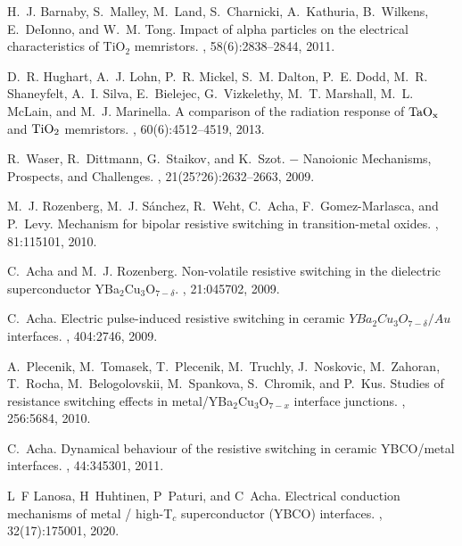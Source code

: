 \documentclass[square,aip,preprint,showkeys,superscriptaddress]{revtex4}
\begin{document}
\begin{thebibliography}{10}
	H.~J. {Barnaby}, S.~{Malley}, M.~{Land}, S.~{Charnicki}, A.~{Kathuria},
	B.~{Wilkens}, E.~{DeIonno}, and W.~M. {Tong}.
	\newblock Impact of alpha particles on the electrical characteristics of
	{TiO$_{2}$} memristors.
	, 58(6):2838--2844, 2011.
	
	D.~R. {Hughart}, A.~J. {Lohn}, P.~R. {Mickel}, S.~M. {Dalton}, P.~E. {Dodd},
	M.~R. {Shaneyfelt}, A.~I. {Silva}, E.~{Bielejec}, G.~{Vizkelethy}, M.~T.
	{Marshall}, M.~L. {McLain}, and M.~J. {Marinella}.
	\newblock A comparison of the radiation response of {${\rm TaO}_{\rm x}$} and
	{${\rm TiO}_2$} memristors.
	, 60(6):4512--4519, 2013.
	
	R.~Waser, R.~Dittmann, G.~Staikov, and K.~Szot.
	 {$-$} {Nanoionic
		Mechanisms, Prospects, and Challenges}.
	, 21(25?26):2632--2663, 2009.
	
	M.~J. Rozenberg, M.~J. S\'anchez, R.~Weht, C.~Acha, F.~Gomez-Marlasca, and
	P.~Levy.
	\newblock Mechanism for bipolar resistive switching in transition-metal oxides.
	, 81:115101, 2010.
	
	C.~Acha and M.~J. Rozenberg.
	\newblock Non-volatile resistive switching in the dielectric superconductor
	{YBa$_2$Cu$_3$O$_{7-\delta}$}.
	, 21:045702, 2009.
	
	C.~Acha.
	\newblock Electric pulse-induced resistive switching in ceramic
	{$YBa_2Cu_3O_{7-\delta} / Au$} interfaces.
	, 404:2746, 2009.
	
	A.~Plecenik, M.~Tomasek, T.~Plecenik, M.~Truchly, J.~Noskovic, M.~Zahoran,
	T.~Rocha, M.~Belogolovskii, M.~Spankova, S.~Chromik, and P.~Kus.
	\newblock Studies of resistance switching effects in
	metal/{YBa$_2$Cu$_3$O$_{7-x}$} interface junctions.
	, 256:5684, 2010.
	
	C.~Acha.
	\newblock Dynamical behaviour of the resistive switching in ceramic
	{YBCO}/metal interfaces.
	, 44:345301, 2011.
	
	L~F Lanosa, H~Huhtinen, P~Paturi, and C~Acha.
	\newblock Electrical conduction mechanisms of metal / high-{T$_c$}
	superconductor ({YBCO}) interfaces.
	, 32(17):175001, 2020.
	

\end{thebibliography}
\end{document}
